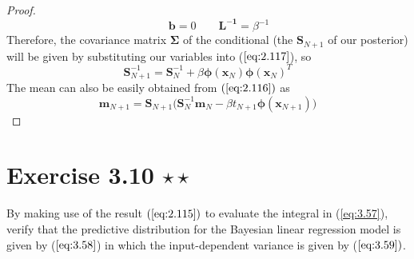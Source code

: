 \begin{proof}
\begin{equation*}
        \hspace{2em}
        \mathbf{b} = 0
        \hspace{2em}
        \mathbf{L^{-1}} = \beta^{-1}
    \end{equation*}
    Therefore, the covariance matrix $\mathbf{\Sigma}$ of the conditional (the $\mathbf{S}_{N + 1}$ 
    of our posterior) will be given by substituting our variables into ($\ref{eq:2.117}$), so
    \begin{equation*}
        \mathbf{S}_{N + 1}^{-1} = \mathbf{S}_N^{-1} + \beta \bm{\phi}(\mathbf{x}_N)\bm{\phi}(\mathbf{x}_N)^T
    \end{equation*}
    The mean can also be easily obtained from $(\ref{eq:2.116})$ as
    \begin{equation*}
        \mathbf{m}_{N + 1}
        = \mathbf{S}_{N + 1}\big(\mathbf{S}_N^{-1} \mathbf{m}_N 
             - \beta t_{N + 1} \bm{\phi}(\mathbf{x}_{N + 1})\big)
    \end{equation*}
\end{proof}

\section*{Exercise 3.10 $\star \star$}
By making use of the result $(\ref{eq:2.115})$ to evaluate the integral
in (\ref{eq:3.57}), verify that the predictive distribution for the Bayesian linear
regression model is given by ($\ref{eq:3.58}$) in which the input-dependent variance is
given by ($\ref{eq:3.59})$.

\vspace{1em}

